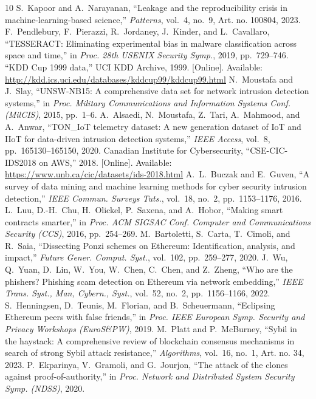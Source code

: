 \documentclass[journal]{IEEEtran}
\begin{document}
\begin{thebibliography}{10}
 S.~Kapoor and A.~Narayanan, ``Leakage and the reproducibility crisis in machine-learning-based science,'' \emph{Patterns}, vol.~4, no.~9, Art. no. 100804, 2023.
 F.~Pendlebury, F.~Pierazzi, R.~Jordaney, J.~Kinder, and L.~Cavallaro, ``TESSERACT: Eliminating experimental bias in malware classification across space and time,'' in \emph{Proc. 28th USENIX Security Symp.}, 2019, pp.~729--746.
 ``KDD Cup 1999 data,'' UCI KDD Archive, 1999. [Online]. Available: \url{http://kdd.ics.uci.edu/databases/kddcup99/kddcup99.html}
 N.~Moustafa and J.~Slay, ``UNSW-NB15: A comprehensive data set for network intrusion detection systems,'' in \emph{Proc. Military Communications and Information Systems Conf. (MilCIS)}, 2015, pp.~1--6.
 A.~Alsaedi, N.~Moustafa, Z.~Tari, A.~Mahmood, and A.~Anwar, ``TON\_IoT telemetry dataset: A new generation dataset of IoT and IIoT for data-driven intrusion detection systems,'' \emph{IEEE Access}, vol.~8, pp.~165130--165150, 2020.
 Canadian Institute for Cybersecurity, ``CSE-CIC-IDS2018 on AWS,'' 2018. [Online]. Available: \url{https://www.unb.ca/cic/datasets/ids-2018.html}
 A.~L.~Buczak and E.~Guven, ``A survey of data mining and machine learning methods for cyber security intrusion detection,'' \emph{IEEE Commun. Surveys Tuts.}, vol.~18, no.~2, pp.~1153--1176, 2016.
 L.~Luu, D.-H.~Chu, H.~Olickel, P.~Saxena, and A.~Hobor, ``Making smart contracts smarter,'' in \emph{Proc. ACM SIGSAC Conf. Computer and Communications Security (CCS)}, 2016, pp.~254--269.
 M.~Bartoletti, S.~Carta, T.~Cimoli, and R.~Saia, ``Dissecting Ponzi schemes on Ethereum: Identification, analysis, and impact,'' \emph{Future Gener. Comput. Syst.}, vol.~102, pp.~259--277, 2020.
 J.~Wu, Q.~Yuan, D.~Lin, W.~You, W.~Chen, C.~Chen, and Z.~Zheng, ``Who are the phishers? Phishing scam detection on Ethereum via network embedding,'' \emph{IEEE Trans. Syst., Man, Cybern., Syst.}, vol.~52, no.~2, pp.~1156--1166, 2022.
 S.~Henningsen, D.~Teunis, M.~Florian, and B.~Scheuermann, ``Eclipsing Ethereum peers with false friends,'' in \emph{Proc. IEEE European Symp. Security and Privacy Workshops (EuroS\&PW)}, 2019.
 M.~Platt and P.~McBurney, ``Sybil in the haystack: A comprehensive review of blockchain consensus mechanisms in search of strong Sybil attack resistance,'' \emph{Algorithms}, vol.~16, no.~1, Art. no. 34, 2023.
 P.~Ekparinya, V.~Gramoli, and G.~Jourjon, ``The attack of the clones against proof-of-authority,'' in \emph{Proc. Network and Distributed System Security Symp. (NDSS)}, 2020.

\end{thebibliography}
\end{document}
